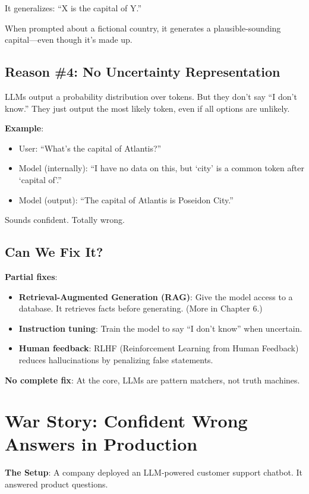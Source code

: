 It generalizes: ``X is the capital of Y.''

When prompted about a fictional country, it generates a plausible-sounding capital---even though it's made up.

\subsection{Reason \#4: No Uncertainty Representation}

LLMs output a probability distribution over tokens. But they don't say ``I don't know.'' They just output the most likely token, even if all options are unlikely.

\textbf{Example}:
\begin{itemize}
\item User: ``What's the capital of Atlantis?''
\item Model (internally): ``I have no data on this, but `city' is a common token after `capital of'.''
\item Model (output): ``The capital of Atlantis is Poseidon City.''
\end{itemize}

Sounds confident. Totally wrong.

\subsection{Can We Fix It?}

\textbf{Partial fixes}:
\begin{itemize}
\item \textbf{Retrieval-Augmented Generation (RAG)}: Give the model access to a database. It retrieves facts before generating. (More in Chapter 6.)
\item \textbf{Instruction tuning}: Train the model to say ``I don't know'' when uncertain.
\item \textbf{Human feedback}: RLHF (Reinforcement Learning from Human Feedback) reduces hallucinations by penalizing false statements.
\end{itemize}

\textbf{No complete fix}: At the core, LLMs are pattern matchers, not truth machines.

\section{War Story: Confident Wrong Answers in Production}

\textbf{The Setup}: A company deployed an LLM-powered customer support chatbot. It answered product questions.

